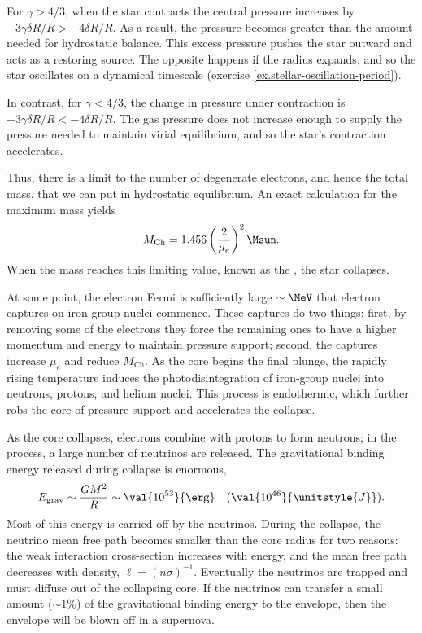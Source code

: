 \begin{sidebar}
For $\gamma > 4/3$, when the star contracts the central pressure increases by $-3\gamma\delta R/R > -4\delta R/R$. As a result, the pressure becomes greater than the amount needed for hydrostatic balance. This excess pressure pushes the star outward and acts as a restoring source. The opposite happens if the radius expands, and so the star oscillates on a dynamical timescale (exercise \ref{ex.stellar-oscillation-period}).

In contrast, for $\gamma < 4/3$, the change in pressure under contraction is $-3\gamma\delta R/R < -4\delta R/R$. The gas pressure does not increase enough to supply the pressure needed to maintain virial equilibrium, and so the star's contraction accelerates.

\end{sidebar}

Thus, there is a limit to the number of degenerate electrons, and hence the total mass, that we can put in hydrostatic equilibrium.  An exact calculation for the maximum mass yields
\begin{equation}\label{e.Chandrasekhar}
	M_{\mathrm{Ch}} = 1.456 \left(\frac{2}{\mu_{e}}\right)^{2}\Msun.
\end{equation}
When the mass reaches this limiting value, known as the , the star collapses.

At some point, the electron Fermi is sufficiently large $\sim\MeV$ that electron captures on iron-group nuclei commence. These captures do two things: first, by removing some of the electrons they force the remaining ones to have a higher momentum and energy to maintain pressure support; second, the captures increase $\mu_{e}$ and reduce $M_{\mathrm{Ch}}$. As the core begins the final plunge, the rapidly rising temperature induces the photodisintegration of iron-group nuclei into neutrons, protons, and helium nuclei. This process is endothermic, which further robs the core of pressure support and accelerates the collapse.

As the core collapses, electrons combine with protons to form neutrons; in the process, a large number of neutrinos are released. The gravitational binding energy released during collapse is enormous,
\[ E_{\mathrm{grav}} \sim \frac{GM^{2}}{R} \sim \val{10^{53}}{\erg}\quad(\val{10^{46}}{\unitstyle{J}}). \]
Most of this energy is carried off by the neutrinos. During the collapse, the neutrino mean free path becomes smaller than the core radius for two reasons: the weak interaction cross-section increases with energy, and the mean free path decreases with density, $\ell = (n\sigma)^{-1}$. Eventually the neutrinos are trapped and must diffuse out of the collapsing core. If the neutrinos can transfer a small amount  ($\sim 1\%$) of the gravitational binding energy to the envelope, then the envelope will be blown off in a supernova.

